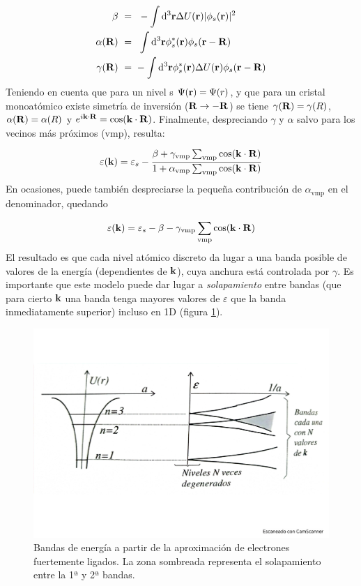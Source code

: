 \begin{equation}
	\begin{split}
		\beta \ = \ &  \ - \int   \mathrm{d}^3 \mathbf{r} \Delta U (\mathbf{r}) |\phi_s (\mathbf{r}) |^2 \\
		\alpha (\mathbf{R}) \ = \ & \ \int \mathrm{d}^3\mathbf{r} \phi_s^* (\mathbf{r}) \phi_s (\mathbf{r}-\mathbf{R}) \\
		\gamma (\mathbf{R}) \ = \ & - \int \mathrm{d}^3 \mathbf{r} \phi_s^* (\mathbf{r}) \Delta U (\mathbf{r}) \phi_s (\mathbf{r} - \mathbf{R})
	\end{split}
\end{equation}
Teniendo en cuenta que para un nivel s $\Psi (\mathbf{r}) = \Psi (r)$, y que para un cristal monoatómico existe simetría de inversión ($\mathbf{R} \rightarrow - \mathbf{R}$) se tiene $\gamma (\mathbf{R}) = \gamma (R)$, $\alpha (\mathbf{R}) = \alpha (R)$ y $e^{i \mathbf{k} \cdot \mathbf{R}} = \cos (\mathbf{k} \cdot \mathbf{R})$. Finalmente, despreciando $\gamma$ y $\alpha$ salvo para los vecinos más próximos (vmp), resulta:

\begin{equation}
	\varepsilon(\mathbf{k}) = \varepsilon_s - \frac{\beta + \gamma_{\text{vmp}} \sum_{\text{vmp}} \cos (\mathbf{k} \cdot \mathbf{R})}{1+\alpha_{\text{vmp}} \sum_{\text{vmp}} \cos (\mathbf{k} \cdot \mathbf{R})}
\end{equation}
En ocasiones, puede también despreciarse la pequeña contribución de $\alpha_{\text{vmp}}$ en el denominador, quedando

\begin{equation}
	\varepsilon(\mathbf{k}) = \varepsilon_s - \beta - \gamma_{\text{vmp}} \sum_{\text{vmp}} \cos (\mathbf{k}\cdot \mathbf{R})
\end{equation}
El resultado es que cada nivel atómico discreto da lugar a una banda posible de valores de la energía (dependientes de $\mathbf{k}$), cuya anchura está controlada por $\gamma$. Es importante que este modelo puede dar lugar a \textit{solapamiento} entre bandas (que para cierto $\mathbf{k}$ una banda tenga mayores valores de $\varepsilon$ que la banda inmediatamente superior) incluso en 1D (figura \ref{Fig:07-06}). 


\begin{figure}[h!] \centering
	\includegraphics[scale=0.35]{Cuerpo/Ch_07/Fotos libro 6.pdf}
	\caption{Bandas de energía a partir de la aproximación de electrones fuertemente ligados. La zona sombreada representa el solapamiento entre la 1ª y 2ª bandas.}
	\label{Fig:07-06}
\end{figure}    

